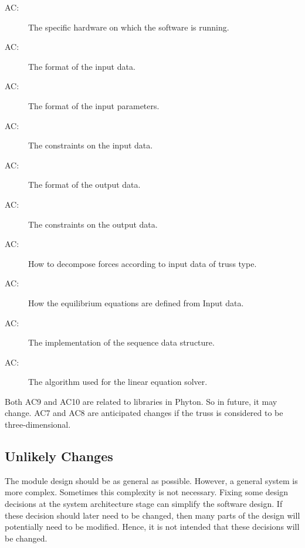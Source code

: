 \documentclass[12pt, titlepage]{article}
\newcounter{acnum}
\newcommand{\actheacnum}{AC\theacnum}
\begin{document}
\begin{description}
\item[ \actheacnum \label{acHardware}:] The specific
  hardware on which the software is running.
\item[ \actheacnum \label{acInput}:] The format of the
   input data.
 \item[ \actheacnum \label{acParam}:] The format of the
   input parameters.
  \item[ \actheacnum \label{acVerify}:] The constraints on the input data.
\item[ \actheacnum \label{acOutput}:] The format of the output data.  
\item[ \actheacnum \label{acOutVeri}:] The constraints on the output data.
\item[ \actheacnum \label{acDecompos}:] How to decompose forces according to input data of truss type.
\item[ \actheacnum \label{acEq}:] How the equilibrium equations are defined from Input data.
\item[ \actheacnum \label{acSeq}:] The implementation of the sequence data structure.
\item[ \actheacnum \label{acLinalg}:] The algorithm used for the linear equation solver.
 
\end{description}
 Both AC9 and AC10 are related to libraries in Phyton. So in future, it may change. AC7 and AC8 are anticipated changes if the truss is considered to be three-dimensional. 

\subsection{Unlikely Changes} \label{SecUchange}

The module design should be as general as possible. However, a general system is
more complex. Sometimes this complexity is not necessary. Fixing some design
decisions at the system architecture stage can simplify the software design. If
these decision should later need to be changed, then many parts of the design
will potentially need to be modified. Hence, it is not intended that these
decisions will be changed.
\end{document}
